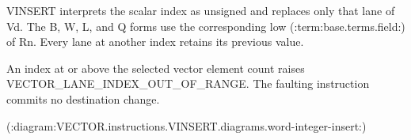 VINSERT interprets the scalar index as unsigned and replaces only that lane of
Vd. The B, W, L, and Q forms use the corresponding low (:term:base.terms.field:) of
Rn. Every lane at another index retains its previous value.

An index at or above the selected vector element count raises
VECTOR\_LANE\_INDEX\_OUT\_OF\_RANGE. The faulting instruction
commits no destination change.

(:diagram:VECTOR.instructions.VINSERT.diagrams.word-integer-insert:)
